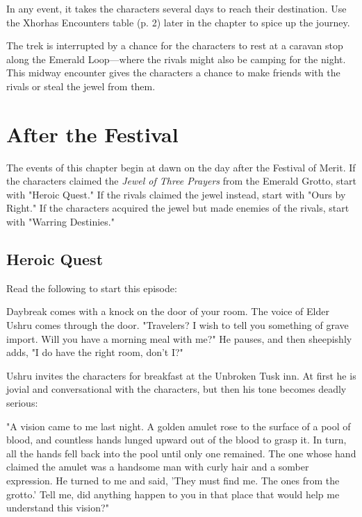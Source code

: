 \documentclass[letterpaper, 11pt, bg=full, twocolumn]{dndbook}
\begin{document}
In any event, it takes the characters several days to reach their destination. Use the Xhorhas Encounters table (p. 2) later in the chapter to spice up the journey.

The trek is interrupted by a chance for the characters to rest at a caravan stop along the Emerald Loop---where the rivals might also be camping for the night. This midway encounter gives the characters a chance to make friends with the rivals or steal the jewel from them.
\section{After the Festival}

The events of this chapter begin at dawn on the day after the Festival of Merit. If the characters claimed the \textit{Jewel of Three Prayers} from the Emerald Grotto, start with "Heroic Quest." If the rivals claimed the jewel instead, start with "Ours by Right." If the characters acquired the jewel but made enemies of the rivals, start with "Warring Destinies."

\subsection{Heroic Quest}

Read the following to start this episode:

\begin{DndReadAloud}
Daybreak comes with a knock on the door of your room. The voice of Elder Ushru comes through the door. "Travelers? I wish to tell you something of grave import. Will you have a morning meal with me?" He pauses, and then sheepishly adds, "I do have the right room, don't I?"
\end{DndReadAloud}

Ushru invites the characters for breakfast at the Unbroken Tusk inn. At first he is jovial and conversational with the characters, but then his tone becomes deadly serious:

\begin{DndReadAloud}
"A vision came to me last night. A golden amulet rose to the surface of a pool of blood, and countless hands lunged upward out of the blood to grasp it. In turn, all the hands fell back into the pool until only one remained. The one whose hand claimed the amulet was a handsome man with curly hair and a somber expression. He turned to me and said, 'They must find me. The ones from the grotto.' Tell me, did anything happen to you in that place that would help me understand this vision?"
\end{DndReadAloud}
\end{document}
